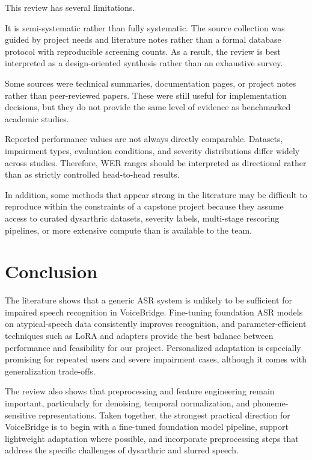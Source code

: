 \documentclass{article}
\begin{document}
This review has several limitations.

It is semi-systematic rather than fully systematic. The source collection was guided by project needs and literature notes rather than a formal database protocol with reproducible screening counts. As a result, the review is best interpreted as a design-oriented synthesis rather than an exhaustive survey.

Some sources were technical summaries, documentation pages, or project notes rather than peer-reviewed papers. These were still useful for implementation decisions, but they do not provide the same level of evidence as benchmarked academic studies.

Reported performance values are not always directly comparable. Datasets, impairment types, evaluation conditions, and severity distributions differ widely across studies. Therefore, WER ranges should be interpreted as directional rather than as strictly controlled head-to-head results.

In addition, some methods that appear strong in the literature may be difficult to reproduce within the constraints of a capstone project because they assume access to curated dysarthric datasets, severity labels, multi-stage rescoring pipelines, or more extensive compute than is available to the team.

\section{Conclusion}

The literature shows that a generic ASR system is unlikely to be sufficient for impaired speech recognition in VoiceBridge. Fine-tuning foundation ASR models on atypical-speech data consistently improves recognition, and parameter-efficient techniques such as LoRA and adapters provide the best balance between performance and feasibility for our project. Personalized adaptation is especially promising for repeated users and severe impairment cases, although it comes with generalization trade-offs.

The review also shows that preprocessing and feature engineering remain important, particularly for denoising, temporal normalization, and phoneme-sensitive representations. Taken together, the strongest practical direction for VoiceBridge is to begin with a fine-tuned foundation model pipeline, support lightweight adaptation where possible, and incorporate preprocessing steps that address the specific challenges of dysarthric and slurred speech.
\end{document}
